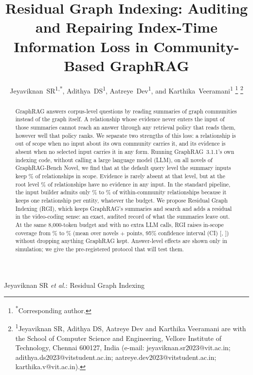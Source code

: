 \documentclass[journal]{IEEEtran}
\theoremstyle{remark}
\begin{document}
\title{Residual Graph Indexing: Auditing and Repairing Index-Time Information Loss in Community-Based GraphRAG}

\author{Jeyaviknan~SR\textsuperscript{1,*}, Adithya~DS\textsuperscript{1}, Aatreye~Dev\textsuperscript{1}, and Karthika~Veeramani\textsuperscript{1}%
\thanks{\textsuperscript{*}Corresponding author.}%
\thanks{\textsuperscript{1}Jeyaviknan SR, Adithya DS, Aatreye Dev and Karthika Veeramani are with the School of Computer Science and Engineering, Vellore Institute of Technology, Chennai 600127, India (e-mail: jeyaviknan.sr2023@vit.ac.in; adithya.ds2023@vitstudent.ac.in; aatreye.dev2023@vitstudent.ac.in; karthika.v@vit.ac.in).}}

%
{Jeyaviknan SR \MakeLowercase{\textit{et al.}}: Residual Graph Indexing}

\maketitle

\begin{abstract}
GraphRAG answers corpus-level questions by reading summaries of graph communities instead of the graph itself. A relationship whose evidence never enters the input of those summaries cannot reach an answer through any retrieval policy that reads them, however well that policy ranks. We separate two strengths of this loss: a relationship is out of scope when no input about its own community carries it, and its evidence is absent when no selected input carries it in any form. Running GraphRAG~3.1.1's own indexing code, without calling a large language model (LLM), on all \NNovels{} novels of GraphRAG-Bench Novel, we find that at the default query level the summary inputs keep \CovCG\% of \NRels{} relationships in scope. Evidence is rarely absent at that level, but at the root level \AbsAG\% of relationships have no evidence in any input. In the standard pipeline, the input builder admits only \SelMin\% to \SelMax\% of within-community relationships because it keeps one relationship per entity, whatever the budget. We propose Residual Graph Indexing (RGI), which keeps GraphRAG's summaries and search and adds a residual in the video-coding sense: an exact, audited record of what the summaries leave out. At the same 8,000-token budget and with no extra LLM calls, RGI raises in-scope coverage from \CovCG\% to \CovCR\% (mean over novels $+$\MacroDiffC{} points, 95\% confidence interval (CI) [\MacroDiffCLo, \MacroDiffCHi]) without dropping anything GraphRAG kept. Answer-level effects are shown only in simulation; we give the pre-registered protocol that will test them.
\end{abstract}
\end{document}
